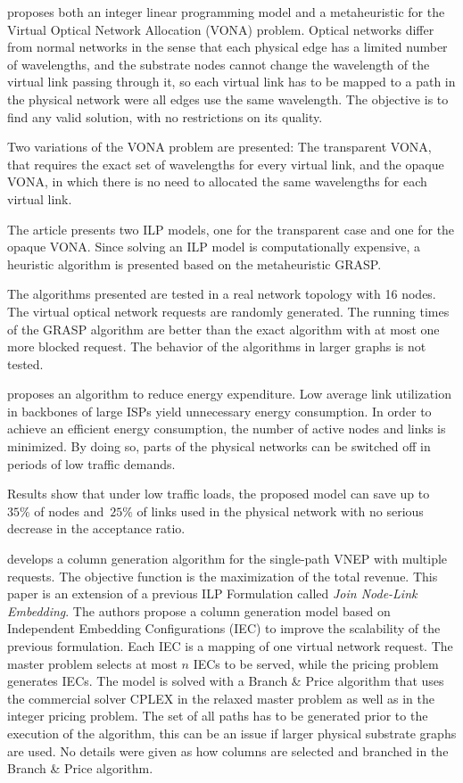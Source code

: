 \citet{Pages:2012} proposes both an integer linear programming model and a metaheuristic for the Virtual Optical Network Allocation (VONA) problem. Optical networks differ from normal networks in the sense that each physical edge has a limited number of wavelengths, and the substrate nodes cannot change the wavelength of the virtual link passing through it, so each virtual link has to be mapped to a path in the physical network were all edges use the same wavelength. The objective is to find any valid solution, with no restrictions on its quality.

Two variations of the VONA problem are presented: The transparent VONA, that requires the exact set of wavelengths for every virtual link, and the opaque VONA, in which there is no need to allocated the same wavelengths for each virtual link.

The article presents two ILP models, one for the transparent case and one for the opaque VONA\@. Since solving an ILP model is computationally expensive, a heuristic algorithm is presented based on the metaheuristic GRASP.

The algorithms presented are tested in a real network topology with 16 nodes. The virtual optical network requests are randomly generated. The running times of the GRASP algorithm are better than the exact algorithm with at most one more blocked request. The behavior of the algorithms in larger graphs is not tested.



\citet{Botero:2012} proposes an algorithm to reduce energy expenditure. Low average link utilization in backbones of large ISPs yield unnecessary energy consumption. In order to achieve an efficient energy consumption, the number of active nodes and links is minimized. By doing so, parts of the physical networks can be switched off in periods of low traffic demands.

Results show that under low traffic loads, the proposed model can save up to~$35\%$ of nodes and~$25\%$ of links used in the physical network with no serious decrease in the acceptance ratio.




\citet{Jarray2012} develops a column generation algorithm for the single-path VNEP with multiple requests.
The objective function is the maximization of the total revenue.
This paper is an extension of a previous ILP Formulation called \emph{Join Node-Link Embedding}.
The authors propose a column generation model based on Independent Embedding Configurations (IEC) to improve the scalability of the previous formulation.
Each IEC is a mapping of one virtual network request.
The master problem selects at most $n$ IECs to be served, while the pricing problem generates IECs.
The model is solved with a Branch \& Price algorithm that uses the commercial solver CPLEX in the relaxed master problem as well as in the integer pricing problem.
The set of all paths has to be generated prior to the execution of the algorithm, this can be an issue if larger physical substrate graphs are used.
No details were given as how columns are selected and branched in the Branch \& Price algorithm.

